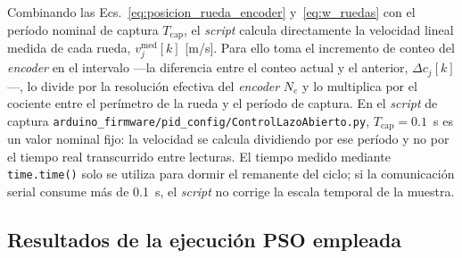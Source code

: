 \begin{appendices}
Combinando las Ecs.~\eqref{eq:posicion_rueda_encoder} y~\eqref{eq:w_ruedas} con el período nominal de captura $T_{\mathrm{cap}}$, el \textit{script} calcula directamente la velocidad lineal medida de cada rueda, $v_j^{\mathrm{med}}[k]$ [m/s]. Para ello toma el incremento de conteo del \textit{encoder} en el intervalo —la diferencia entre el conteo actual y el anterior, $\Delta c_j[k]$—, lo divide por la resolución efectiva del \textit{encoder} $N_e$ y lo multiplica por el cociente entre el perímetro de la rueda y el período de captura. En el \textit{script} de captura \texttt{arduino\_\allowbreak{}firmware/\allowbreak{}pid\_\allowbreak{}config/\allowbreak{}ControlLazoAbierto.\allowbreak{}py}, $T_{\mathrm{cap}}=0.1$~s es un valor nominal fijo: la velocidad se calcula dividiendo por ese período y no por el tiempo real transcurrido entre lecturas. El tiempo medido mediante \texttt{time.time()} solo se utiliza para dormir el remanente del ciclo; si la comunicación serial consume más de 0.1~s, el \textit{script} no corrige la escala temporal de la muestra.

\subsection{Resultados de la ejecución PSO empleada}
\label{anx:resultados_pso_ejecucion}


\end{appendices}
